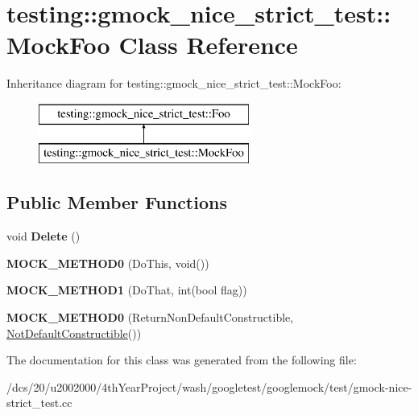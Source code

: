 \hypertarget{classtesting_1_1gmock__nice__strict__test_1_1MockFoo}{}\section{testing\+:\+:gmock\+\_\+nice\+\_\+strict\+\_\+test\+:\+:Mock\+Foo Class Reference}
\label{classtesting_1_1gmock__nice__strict__test_1_1MockFoo}
Inheritance diagram for testing\+:\+:gmock\+\_\+nice\+\_\+strict\+\_\+test\+:\+:Mock\+Foo\+:\begin{figure}[H]
\begin{center}
\leavevmode
\includegraphics[height=2.000000cm]{classtesting_1_1gmock__nice__strict__test_1_1MockFoo}
\end{center}
\end{figure}
\subsection*{Public Member Functions}
\begin{DoxyCompactItemize}
\item 
\mbox{\label{classtesting_1_1gmock__nice__strict__test_1_1MockFoo_a7bdec6a6353e4396d551dbf8f2beac54}} 
void {\bfseries Delete} ()
\item 
\mbox{\label{classtesting_1_1gmock__nice__strict__test_1_1MockFoo_a14ee661ebc461096824e876a9308840e}} 
{\bfseries M\+O\+C\+K\+\_\+\+M\+E\+T\+H\+O\+D0} (Do\+This, void())
\item 
\mbox{\label{classtesting_1_1gmock__nice__strict__test_1_1MockFoo_a3a7bfcf303a2c8578db900c9525b02a1}} 
{\bfseries M\+O\+C\+K\+\_\+\+M\+E\+T\+H\+O\+D1} (Do\+That, int(bool flag))
\item 
\mbox{\label{classtesting_1_1gmock__nice__strict__test_1_1MockFoo_a2d69a27a8789f04938cb1eb0047bb677}} 
{\bfseries M\+O\+C\+K\+\_\+\+M\+E\+T\+H\+O\+D0} (Return\+Non\+Default\+Constructible, \mbox{\hyperlink{classtesting_1_1gmock__nice__strict__test_1_1NotDefaultConstructible}{Not\+Default\+Constructible}}())
\end{DoxyCompactItemize}


The documentation for this class was generated from the following file\+:\begin{DoxyCompactItemize}
\item 
/dcs/20/u2002000/4th\+Year\+Project/wash/googletest/googlemock/test/gmock-\/nice-\/strict\+\_\+test.\+cc\end{DoxyCompactItemize}
